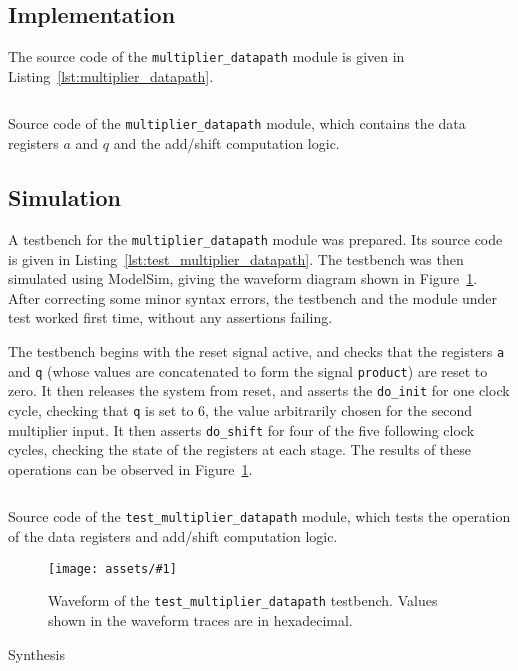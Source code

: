 \documentclass[a4paper]{article}
\newcommand{\modulelisting}[3]{
  \begin{listing}[p]
    \linespread{.9}\inputminted[fontsize=\scriptsize,linenos]{systemverilog}{#2}
    \caption{#3}
    \label{lst:#1}
  \end{listing}
}
\newcommand{\waveformfigure}[3]{
  \begin{figure}[p]
    \centering\texttt{[image: assets/\#1]}
    \caption{#2}
    \label{fig:#1}
  \end{figure}
}
\begin{document}
\subsection{Implementation}
\label{sec:reg:impl}

The source code of the \texttt{multiplier\_datapath} module is given in Listing~\ref{lst:multiplier_datapath}.

\modulelisting{multiplier_datapath}{../src/multiplier/multiplier_datapath.sv}
  {Source code of the \texttt{multiplier\_datapath} module, which contains the data registers $a$ and $q$ and the add/shift computation logic.}

\subsection{Simulation}
\label{sec:reg:sim}

A testbench for the \texttt{multiplier\_datapath} module was prepared. Its source code is given in Listing~\ref{lst:test_multiplier_datapath}. The testbench was then simulated using ModelSim, giving the waveform diagram shown in Figure~\ref{fig:test_multiplier_datapath}. After correcting some minor syntax errors, the testbench and the module under test worked first time, without any assertions failing.

The testbench begins with the reset signal active, and checks that the registers \texttt{a} and \texttt{q} (whose values are concatenated to form the signal \texttt{product}) are reset to zero. It then releases the system from reset, and asserts the \texttt{do\_init} for one clock cycle, checking that \texttt{q} is set to 6, the value arbitrarily chosen for the second multiplier input. It then asserts \texttt{do\_shift} for four of the five following clock cycles, checking the state of the registers at each stage. The results of these operations can be observed in Figure~\ref{fig:test_multiplier_datapath}.

\modulelisting{test_multiplier_datapath}{../src/multiplier/test/test_multiplier_datapath.sv}
  {Source code of the \texttt{test\_multiplier\_datapath} module, which tests the operation of the data registers and add/shift computation logic.}

\waveformfigure{test_multiplier_datapath}{Waveform of the \texttt{test\_multiplier\_datapath} testbench. Values shown in the waveform traces are in hexadecimal.}

\subsection{Synthesis}
\label{sec:reg:synth}
\end{document}
